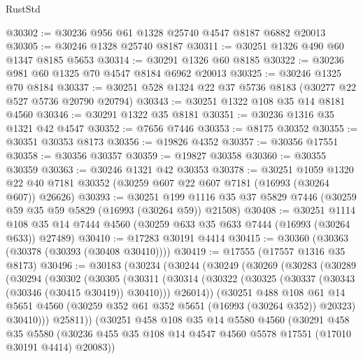 \begin{lexlean}{RustStd}
\begin{coremodule}
{\begin{coremodule}
{{{{{{{{{{{{{{{{{{{{{{{{{{{{{{{{{{{{{{{{{{{{{{{{{{{{{{{@30302 := @30236 @956 @61 @1328 @25740 @4547 @8187 @6882 @20013
@30305 := @30246 @1328 @25740 @8187
@30311 := @30251 @1326 @490 @60 @1347 @8185 @5653
@30314 := @30291 @1326 @60 @8185
@30322 := @30236 @981 @60 @1325 @70 @4547 @8184 @6962 @20013
@30325 := @30246 @1325 @70 @8184
@30337 := @30251 @528 @1324 @22 @37 @5736 @8183 (@30277 @22 @527 @5736 @20790 @20794)
@30343 := @30251 @1322 @108 @35 @14 @8181 @4560
@30346 := @30291 @1322 @35 @8181
@30351 := @30236 @1316 @35 @1321 @42 @4547
@30352 := @7656 @7446
@30353 := @8175 @30352
@30355 := @30351 @30353 @8173
@30356 := @19826 @4352
@30357 := @30356 @17551
@30358 := @30356 @30357
@30359 := @19827 @30358
@30360 := @30355 @30359
@30363 := @30246 @1321 @42 @30353
@30378 := @30251
    @1059
    @1320
    @22
    @40
    @7181
    @30352
    (@30259 @607 @22 @607 @7181 (@16993 (@30264 @607)) @26626)
@30393 := @30251
    @199
    @1116
    @35
    @37
    @5829
    @7446
    (@30259 @59 @35 @59 @5829 (@16993 (@30264 @59)) @21508)
@30408 := @30251
    @1114
    @108
    @35
    @14
    @7444
    @4560
    (@30259 @633 @35 @633 @7444 (@16993 (@30264 @633)) @27489)
@30410 := @17283 @30191 @4414
@30415 := @30360 (@30363 (@30378 (@30393 (@30408 @30410))))
@30419 := @17555 (@17557 @1316 @35 @8173)
@30496 := @30183
    (@30234
      (@30244
        (@30249
          (@30269
            (@30283
              (@30289
                (@30294
                  (@30302
                    (@30305
                      (@30311
                        (@30314
                          (@30322
                            (@30325 (@30337 (@30343 (@30346 (@30415 @30419)) @30410)))
                            @26014))
                        (@30251
                          @488
                          @108
                          @61
                          @14
                          @5651
                          @4560
                          (@30259 @352 @61 @352 @5651 (@16993 (@30264 @352)) @20323)
                          @30410)))
                    @25811))
                (@30251
                  @458
                  @108
                  @35
                  @14
                  @5580
                  @4560
                  (@30291
                    @458
                    @35
                    @5580
                    (@30236
                      @455
                      @35
                      @108
                      @14
                      @4547
                      @4560
                      @5578
                      @17551
                      (@17010 @30191 @4414)
                      @20083))
}}}}}}}}}}}}}}}}}}}}}}}}}}}}}}}}}}}}}}}}}}}}}}}}}}}}}}}
\end{coremodule}}
\end{coremodule}
\end{lexlean}
